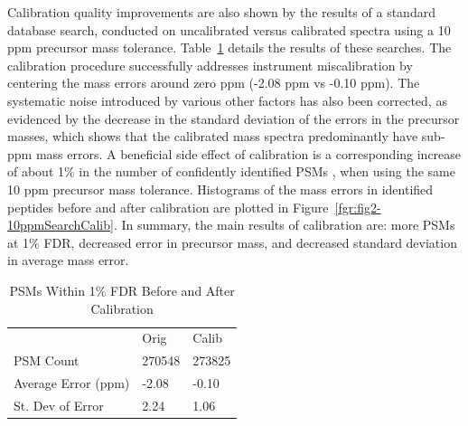 \documentclass[journal=jprobs,manuscript=article]{achemso}
\begin{document}
Calibration quality improvements are also shown by the results of a standard database search, conducted on uncalibrated versus calibrated spectra using a 10 ppm precursor mass tolerance.
Table~\ref{tbl:calib} details the results of these searches.
The calibration procedure successfully addresses instrument miscalibration by centering the mass errors around zero ppm (-2.08 ppm vs -0.10 ppm).
The systematic noise introduced by various other factors has also been corrected, as evidenced by the decrease in the standard deviation of the errors in the precursor masses, which shows that the calibrated mass spectra predominantly have sub-ppm mass errors.
A beneficial side effect of calibration is a corresponding increase of about 1\% in the number of confidently identified PSMs , when using the same 10 ppm precursor mass tolerance.
Histograms of the mass errors in identified peptides before and after calibration are plotted in Figure~\ref{fgr:fig2-10ppmSearchCalib}.
In summary, the main results of calibration are: more PSMs at 1\% FDR, decreased error in precursor mass, and decreased standard deviation in average mass error.

\begin{table}[]
\centering
\caption{PSMs Within 1\% FDR Before and After Calibration}
\label{tbl:calib}
\begin{tabular}{lll}

                                                                                      & Orig        & Calib        \\
 PSM Count                                                           &      270548   &   273825        \\
 Average Error (ppm)                                                              &      -2.08      &        -0.10      \\
 St. Dev of Error                                                    &       2.24      &        1.06      \\
\end{tabular}
\end{table}
\end{document}
